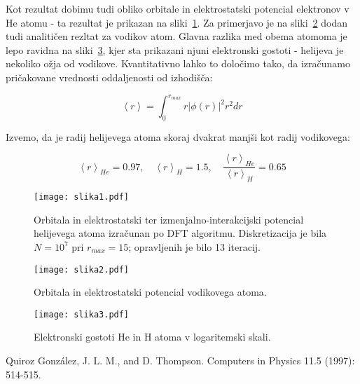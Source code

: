 \documentclass[a4paper]{article}
\newcommand{\expected}[1]{\left\langle #1 \right\rangle}
\begin{document}
    Kot rezultat dobimu tudi obliko orbitale in elektrostatski potencial elektronov v He atomu - ta rezultat je prikazan
    na sliki~\ref{slika1}.
    Za primerjavo je na sliki~\ref{slika2} dodan tudi analitičen rezltat za vodikov atom.
    Glavna razlika med obema atomoma je lepo ravidna na sliki~\ref{slika3}, kjer sta prikazani njuni elektronski
    gostoti - helijeva je nekoliko ožja od vodikove.
    Kvantitativno lahko to določimo tako, da izračunamo pričakovane vrednosti oddaljenosti od izhodišča:

    \begin{equation}\label{eq17}
        \expected{r} = \int_0^{r_{max}} r |\phi(r)|^2 r^2 dr
    \end{equation}

    Izvemo, da je radij helijevega atoma skoraj dvakrat manjši kot radij vodikovega:

    \begin{equation}\label{eq18}
        \expected{r}_{He} = 0.97, \quad \expected{r}_{H} = 1.5, \quad
        \frac{\expected{r}_{He}}{\expected{r}_{H}} = 0.65
    \end{equation}

    \begin{figure}
        \centering
        \texttt{[image: slika1.pdf]}
        \caption{Orbitala in elektrostatski ter izmenjalno-interakcijski potencial helijevega atoma izračunan po
        DFT algoritmu.
        Diskretizacija je bila $N = 10^7$ pri $r_{max} = 15$; opravljenih je bilo 13 iteracij.}
        \label{slika1}
    \end{figure}

    \begin{figure}
        \centering
        \texttt{[image: slika2.pdf]}
        \caption{Orbitala in elektrostatski potencial vodikovega atoma.}
        \label{slika2}
    \end{figure}

    \begin{figure}
        \centering
        \texttt{[image: slika3.pdf]}
        \caption{Elektronski gostoti He in H atoma v logaritemski skali.}
        \label{slika3}
    \end{figure}

    \begin{thebibliography}{9}
        Quiroz González, J. L. M., and D. Thompson.
            Computers in Physics 11.5 (1997): 514-515.
    \end{thebibliography}
\end{document}
